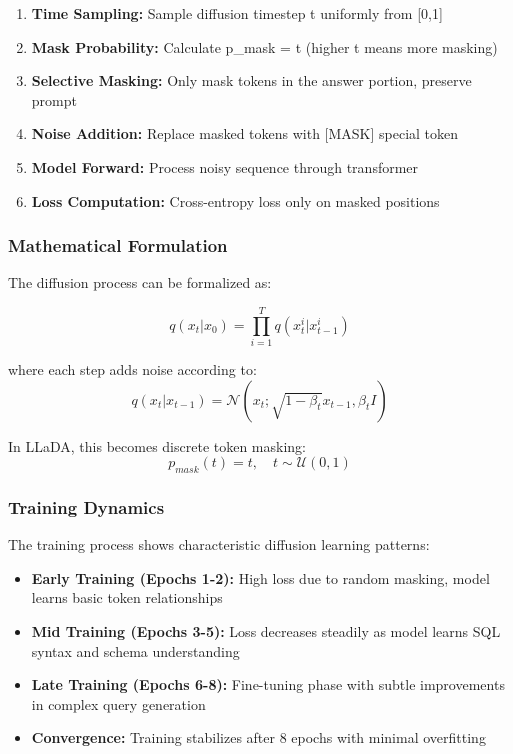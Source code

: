 \documentclass[a4paper,12pt]{article}
\begin{document}
\begin{enumerate}
    \item \textbf{Time Sampling:} Sample diffusion timestep t uniformly from [0,1]
    \item \textbf{Mask Probability:} Calculate p\_mask = t (higher t means more masking)
    \item \textbf{Selective Masking:} Only mask tokens in the answer portion, preserve prompt
    \item \textbf{Noise Addition:} Replace masked tokens with [MASK] special token
    \item \textbf{Model Forward:} Process noisy sequence through transformer
    \item \textbf{Loss Computation:} Cross-entropy loss only on masked positions
\end{enumerate}

\subsubsection*{Mathematical Formulation}
The diffusion process can be formalized as:

\begin{equation}
q(x_t | x_0) = \prod_{i=1}^T q(x_t^i | x_{t-1}^i)
\end{equation}

where each step adds noise according to:
\begin{equation}
q(x_t | x_{t-1}) = \mathcal{N}(x_t; \sqrt{1-\beta_t}x_{t-1}, \beta_t I)
\end{equation}

In LLaDA, this becomes discrete token masking:
\begin{equation}
p_{mask}(t) = t, \quad t \sim \mathcal{U}(0,1)
\end{equation}

\subsubsection*{Training Dynamics}
The training process shows characteristic diffusion learning patterns:

\begin{itemize}
    \item \textbf{Early Training (Epochs 1-2):} High loss due to random masking, model learns basic token relationships
    \item \textbf{Mid Training (Epochs 3-5):} Loss decreases steadily as model learns SQL syntax and schema understanding
    \item \textbf{Late Training (Epochs 6-8):} Fine-tuning phase with subtle improvements in complex query generation
    \item \textbf{Convergence:} Training stabilizes after 8 epochs with minimal overfitting
\end{itemize}
\end{document}
